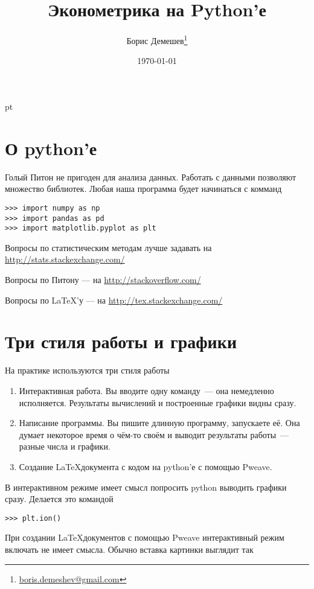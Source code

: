 \documentclass[pdftex,12pt,a4paper]{article}
\title{Эконометрика на Python'е}
\author{Борис Демешев\footnote{\href{mailto:boris.demeshev@gmail.com}{boris.demeshev@gmail.com}}}
\date{\today}
\begin{document}
\maketitle
{} pt %

\todolist

\section{О python'е}

Голый Питон не пригоден для анализа данных. 
Работать с данными позволяют множество библиотек.
Любая наша программа будет начинаться с комманд
\begin{verbatim}
>>> import numpy as np
>>> import pandas as pd
>>> import matplotlib.pyplot as plt
\end{verbatim}




Вопросы по статистическим методам лучше задавать на \url{http://stats.stackexchange.com/}


Вопросы по Питону --- на \url{http://stackoverflow.com/}


Вопросы по \LaTeX'у --- на \url{http://tex.stackexchange.com/}

\section{Три стиля работы и графики}

На практике используются три стиля работы

\begin{enumerate}
\item Интерактивная работа. Вы вводите одну команду~--- она немедленно исполняется. Результаты вычислений и построенные графики видны сразу.
\item Написание программы. Вы пишите длинную программу, запускаете её. Она думает некоторое время о чём-то своём и выводит результаты  работы~--- разные числа и графики.
\item Создание \LaTeX документа с кодом на python'е с помощью Pweave.
\end{enumerate}

В интерактивном режиме имеет смысл попросить python выводить графики сразу. Делается это командой
\begin{verbatim}
>>> plt.ion()
\end{verbatim}


При создании \LaTeX документов с помощью Pweave интерактивный режим включать не имеет смысла. Обычно вставка картинки выглядит так
\end{document}
